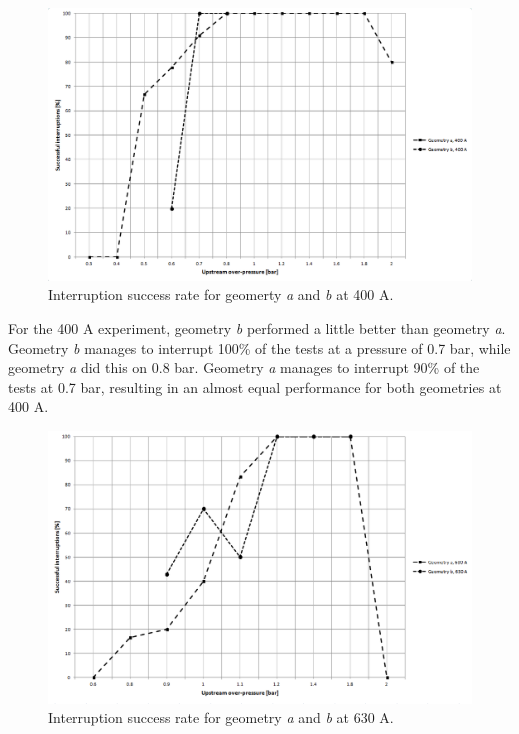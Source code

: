 \documentclass[10pt,a4paper,twoside]{article}
\begin{document}
\begin{figure}[H]
\centering
\includegraphics[scale=0.5]{Bilder/Results/successRate400A.png}
\caption{Interruption success rate for geomerty \textit{a} and \textit{b} at 400 A.} \label{fig:successRate400A}
\end{figure}

For the 400 A experiment, geometry \textit{b} performed a little better than geometry \textit{a}. Geometry \textit{b} manages to interrupt 100\% of the tests at a pressure of 0.7 bar, while geometry \textit{a} did this on 0.8 bar. Geometry \textit{a} manages to interrupt 90\% of the tests at 0.7 bar, resulting in an almost equal performance for both geometries at 400 A.

\begin{figure}[H]
\centering
\includegraphics[scale=0.5]{Bilder/Results/successRate630A.png}
\caption{Interruption success rate for geometry \textit{a} and \textit{b} at 630 A.} \label{fig:successRate630A}
\end{figure}
\end{document}
